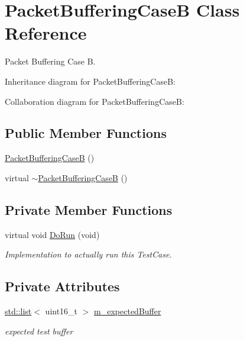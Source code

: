 \hypertarget{classPacketBufferingCaseB}{}\section{Packet\+Buffering\+CaseB Class Reference}
\label{classPacketBufferingCaseB}


Packet Buffering Case B.  




Inheritance diagram for Packet\+Buffering\+CaseB\+:


Collaboration diagram for Packet\+Buffering\+CaseB\+:
\subsection*{Public Member Functions}
\begin{DoxyCompactItemize}
\item 
\hyperlink{classPacketBufferingCaseB_a5b2eb92032030ad9f15d8c9ab1d0fc6a}{Packet\+Buffering\+CaseB} ()
\item 
virtual \hyperlink{classPacketBufferingCaseB_ae9639bf65aaca822ba27f4432d23d758}{$\sim$\+Packet\+Buffering\+CaseB} ()
\end{DoxyCompactItemize}
\subsection*{Private Member Functions}
\begin{DoxyCompactItemize}
\item 
virtual void \hyperlink{classPacketBufferingCaseB_a2a2db05c6e3596bc03521579e1e0c34a}{Do\+Run} (void)
\begin{DoxyCompactList}\small\item\em Implementation to actually run this Test\+Case. \end{DoxyCompactList}\end{DoxyCompactItemize}
\subsection*{Private Attributes}
\begin{DoxyCompactItemize}
\item 
\hyperlink{openflow-interface_8h_afd9bcfa176617760671b67580f536fa7}{std\+::list}$<$ uint16\+\_\+t $>$ \hyperlink{classPacketBufferingCaseB_a7ce5b33bdce1f08d8996fed97295f138}{m\+\_\+expected\+Buffer}
\begin{DoxyCompactList}\small\item\em expected test buffer \end{DoxyCompactList}\end{DoxyCompactItemize}
